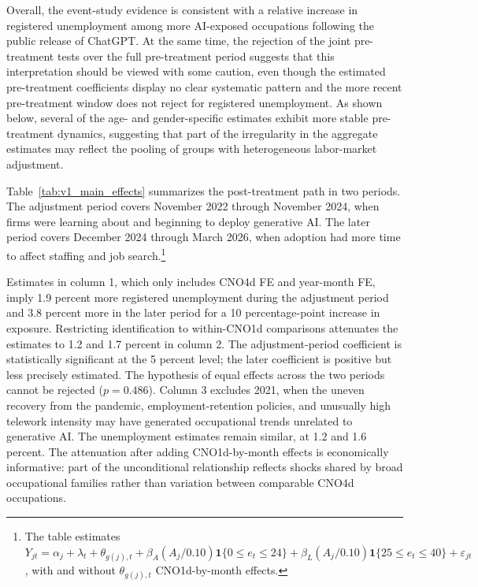 \documentclass[11pt]{article}
\newcommand{\figdir}{uploads/figuresNtables}
\begin{document}
Overall, the event-study evidence is consistent with a relative increase in registered unemployment among more AI-exposed occupations following the public release of ChatGPT. At the same time, the rejection of the joint pre-treatment tests over the full pre-treatment period suggests that this interpretation should be viewed with some caution, even though the estimated pre-treatment coefficients display no clear systematic pattern and the more recent pre-treatment window does not reject for registered unemployment. As shown below, several of the age- and gender-specific estimates exhibit more stable pre-treatment dynamics, suggesting that part of the irregularity in the aggregate estimates may reflect the pooling of groups with heterogeneous labor-market adjustment.



\setcounter{table}{1}


Table~\ref{tab:v1_main_effects} summarizes the post-treatment path in two periods. The adjustment period covers November 2022 through November 2024, when firms were learning about and beginning to deploy generative AI. The later period covers December 2024 through March 2026, when adoption had more time to affect staffing and job search.\footnote{The table estimates \(Y_{jt}=\alpha_j+\lambda_{t}+\theta_{g(j),t}+\beta_A(A_j/0.10)\mathbf{1}\{0\leq e_t\leq24\}+\beta_L(A_j/0.10)\mathbf{1}\{25\leq e_t\leq40\}+\varepsilon_{jt}\), with and without \(\theta_{g(j),t}\) CNO1d-by-month effects.}


Estimates in column 1, which only includes CNO4d FE and year-month FE, imply 1.9 percent more registered unemployment during the adjustment period and 3.8 percent more in the later period for a 10 percentage-point increase in exposure. Restricting identification to within-CNO1d comparisons attenuates the estimates to 1.2 and 1.7 percent in column 2. The adjustment-period coefficient is statistically significant at the 5 percent level; the later coefficient is positive but less precisely estimated. The hypothesis of equal effects across the two periods cannot be rejected (\(p=0.486\)). Column 3 excludes 2021, when the uneven recovery from the pandemic, employment-retention policies, and unusually high telework intensity may have generated occupational trends unrelated to generative AI. The unemployment estimates remain similar, at 1.2 and 1.6 percent. The attenuation after adding CNO1d-by-month effects is economically informative: part of the unconditional relationship reflects shocks shared by broad occupational families rather than variation between comparable CNO4d occupations.
\end{document}
